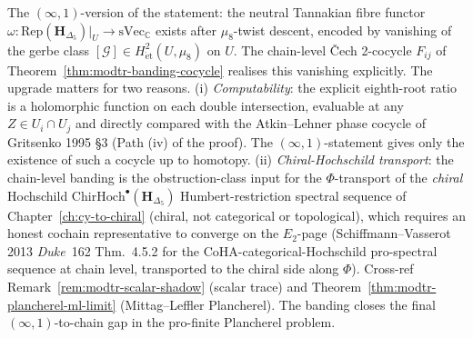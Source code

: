 \begin{remark}
\label{rem:modtr-chain-level-upgrade}
The $(\infty,1)$-version of the statement: the neutral Tannakian fibre functor
$\omega\colon\mathrm{Rep}(\mathbf H_{\Delta_5})|_U\to\mathrm{sVec}_{\mathbb C}$
exists after $\mu_8$-twist descent, encoded by vanishing of the
gerbe class $[\mathcal G]\in H^2_{\mathrm{\acute{e}t}}(U,\mu_8)$
on $U$. The chain-level
\v{C}ech 2-cocycle $F_{ij}$ of
Theorem~\ref{thm:modtr-banding-cocycle} realises this
vanishing explicitly. The upgrade matters for two reasons.
(i) \emph{Computability}: the explicit eighth-root ratio is a
holomorphic function on each double intersection, evaluable at any
$Z\in U_i\cap U_j$ and directly compared with the Atkin--Lehner phase
cocycle of Gritsenko 1995 \S3 (Path (iv) of the proof). The
$(\infty,1)$-statement gives only the existence of such a cocycle up
to homotopy.
(ii) \emph{Chiral-Hochschild transport}: the chain-level banding is
the obstruction-class input for the
\(\Phi\)-transport of the \emph{chiral} Hochschild
$\mathrm{ChirHoch}^\bullet(\mathbf H_{\Delta_5})$ Humbert-restriction
spectral sequence of Chapter~\ref{ch:cy-to-chiral} (chiral, not
categorical or topological), which
requires an honest cochain representative to converge on the
$E_2$-page
(Schiffmann--Vasserot 2013 \emph{Duke}~162 Thm.~4.5.2 for the
CoHA-categorical-Hochschild pro-spectral sequence at chain level,
transported to the chiral side along $\Phi$). Cross-ref
Remark~\ref{rem:modtr-scalar-shadow} (scalar trace) and
Theorem~\ref{thm:modtr-plancherel-ml-limit} (Mittag--Leffler
Plancherel). The banding closes the final $(\infty,1)$-to-chain
gap in the pro-finite Plancherel problem.
\end{remark}

